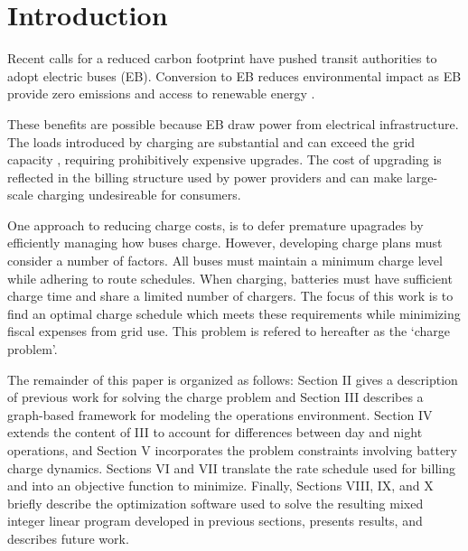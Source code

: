 \section{Introduction}
Recent calls for a reduced carbon footprint have pushed transit authorities to adopt electric buses (EB). Conversion to EB reduces environmental impact as EB provide zero emissions and access to renewable energy \cite{poornesh_comparative_2020}. 
\par These benefits are possible because EB draw power from electrical infrastructure. The loads introduced by charging are substantial and can exceed the grid capacity \cite{stahleder_impact_2019}\cite{deb_impact_2017}\cite{boonraksa_impact_2019}, requiring prohibitively expensive upgrades. The cost of upgrading is reflected in the billing structure used by power providers and can make large-scale charging undesireable for consumers. 
\par One approach to reducing charge costs, is to defer premature upagrades by efficiently managing how buses charge. However, developing charge plans must consider a number of factors. All buses must maintain a minimum charge level while adhering to route schedules. When charging, batteries must have sufficient charge time and share a limited number of chargers. The focus of this work is to find an optimal charge schedule which meets these requirements while minimizing fiscal expenses from grid use. This problem is refered to hereafter as the `charge problem'.  
\par The remainder of this paper is organized as follows: Section II gives a description of previous work for solving the charge problem and Section III describes a graph-based framework for modeling the operations environment.  Section IV extends the content of III to account for differences between day and night operations, and Section V incorporates the problem constraints involving battery charge dynamics.  Sections VI and VII translate the rate schedule used for billing and into an objective function to minimize. Finally, Sections VIII, IX, and X briefly describe the optimization software used to solve the resulting mixed integer linear program developed in previous sections, presents results, and describes future work.
